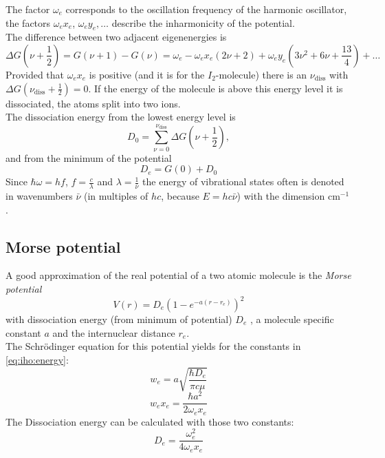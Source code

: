 The factor $\omega_e$ corresponds to the oscillation frequency of the harmonic oscillator, the factors $\omega_e x_e$, $\omega_e y_e, \ldots$ 
describe the inharmonicity of the potential. \\
The difference between two adjacent eigenenergies is
\begin{equation}
\label{eq:iho:energydiff}
  \Delta G \left( \nu + \frac{1}{2} \right) = G(\nu + 1) - G(\nu) = \omega_e - \omega_e x_e (2\nu + 2) + \omega_e y_e \left( 3\nu^2 + 6 \nu + \frac{13}{4} \right) + \ldots 
\end{equation}
Provided that $\omega_e x_e$ is positive (and it is for the $I_2$-molecule) there is an 
$\nu_{\text{diss}}$ with $\Delta G (\nu_{\text{diss}} + \frac{1}{2}) = 0$. If the energy of the molecule is above this energy level it 
is dissociated, the atoms split into two ions. \\
The dissociation energy from the lowest energy level is
\begin{equation}
\label{eq:dissenergy}
  D_0 = \sum_{\nu=0}^{\nu_{\text{diss}}} \Delta G \left( \nu + \frac{1}{2} \right),
\end{equation}
and from the minimum of the potential
\begin{equation}
\label{eq:dissenergy2}
  D_e = G(0) + D_0
\end{equation} 
Since $\hbar \omega = h f$, $f = \frac{c}{\lambda}$ and $\lambda = \frac{1}{\bar{\nu}}$ the energy of vibrational states often is denoted in 
wavenumbers $\bar{\nu}$ (in multiples of $h c$, because $E = hc\bar{\nu}$) with the dimension $\text{cm}^{-1}$.

\subsection{Morse potential}
A good approximation of the real potential of a two atomic molecule is the \emph{Morse potential}
\begin{equation}
  V(r) = D_e \left( 1 - e^{-a(r-r_e)} \right)^2
\end{equation}
with dissociation energy (from minimum of potential) $D_e$ , a molecule specific constant $a$  and the internuclear distance $r_e$. \\
The Schrödinger equation for this potential yields for the constants in \autoref{eq:iho:energy}:
\begin{equation}
\label{eq:morse_we}
  w_e = a \sqrt{\frac{\hbar D_e}{\pi c \mu}}
\end{equation}
\begin{equation}
\label{eq_morse_wexe}
  w_e x_e = \frac{\hbar a^2}{2 \omega_e x_e}
\end{equation}
The Dissociation energy can be calculated with those two constants:
\begin{equation}
\label{eq:morse_dissenergy}
  D_e = \frac{\omega_e^2}{4 \omega_e x_e}
\end{equation}


